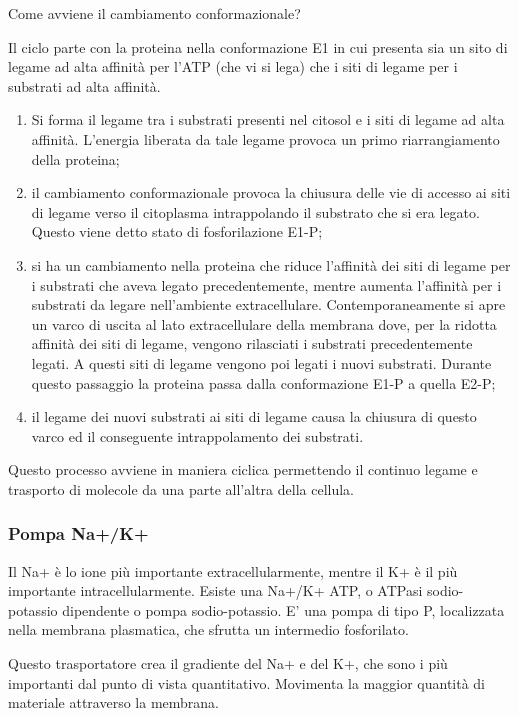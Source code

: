 \documentclass[]{article}
\begin{document}
Come avviene il cambiamento conformazionale?

Il ciclo parte con la proteina nella conformazione E1 in cui presenta
sia un sito di legame ad alta affinità per l'ATP (che vi si lega) che i
siti di legame per i substrati ad alta affinità.

\begin{enumerate}
\def\labelenumi{\arabic{enumi}.}
\itemsep1pt\parskip0pt
\item
  Si forma il legame tra i substrati presenti nel citosol e i siti di
  legame ad alta affinità. L'energia liberata da tale legame provoca un
  primo riarrangiamento della proteina;
\item
  il cambiamento conformazionale provoca la chiusura delle vie di
  accesso ai siti di legame verso il citoplasma intrappolando il
  substrato che si era legato. Questo viene detto stato di
  fosforilazione E1-P;
\item
  si ha un cambiamento nella proteina che riduce l'affinità dei siti di
  legame per i substrati che aveva legato precedentemente, mentre
  aumenta l'affinità per i substrati da legare nell'ambiente
  extracellulare. Contemporaneamente si apre un varco di uscita al lato
  extracellulare della membrana dove, per la ridotta affinità dei siti
  di legame, vengono rilasciati i substrati precedentemente legati. A
  questi siti di legame vengono poi legati i nuovi substrati. Durante
  questo passaggio la proteina passa dalla conformazione E1-P a quella
  E2-P;
\item
  il legame dei nuovi substrati ai siti di legame causa la chiusura di
  questo varco ed il conseguente intrappolamento dei substrati.
\end{enumerate}

Questo processo avviene in maniera ciclica permettendo il continuo
legame e trasporto di molecole da una parte all'altra della cellula.

\subsubsection{Pompa Na+/K+}\label{pompa-nak}

Il Na+ è lo ione più importante extracellularmente, mentre il K+ è il
più importante intracellularmente. Esiste una Na+/K+ ATP, o ATPasi
sodio-potassio dipendente o pompa sodio-potassio. E' una pompa di tipo
P, localizzata nella membrana plasmatica, che sfrutta un intermedio
fosforilato.

Questo trasportatore crea il gradiente del Na+ e del K+, che sono i più
importanti dal punto di vista quantitativo. Movimenta la maggior
quantità di materiale attraverso la membrana.
\end{document}
